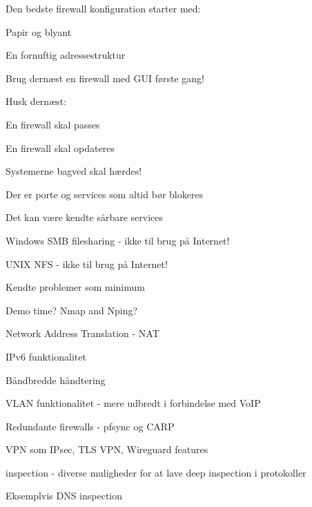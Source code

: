 \documentclass[Screen16to9,17pt]{foils}
\begin{document}
\begin{list1}
\item Den bedste firewall konfiguration starter med:
\begin{list2}
\item Papir og blyant
\item En fornuftig adressestruktur
\end{list2}
\item Brug dernæst en firewall med GUI første gang!
\item Husk dernæst:
\begin{list2}
\item En firewall skal passes
\item En firewall skal opdateres
\item Systemerne bagved skal hærdes!
\end{list2}
\end{list1}





\begin{list1}
\item Der er porte og services som altid bør blokeres
\item Det kan være kendte sårbare services
\begin{list2}
\item Windows SMB filesharing - ikke til brug på Internet!
\item UNIX NFS - ikke til brug på Internet!
\end{list2}
\item Kendte problemer som minimum
\end{list1}

Demo time? Nmap and Nping?



\begin{list2}
\item Network Address Translation - NAT
\item IPv6 funktionalitet

\item Båndbredde håndtering
\item VLAN funktionalitet - mere udbredt i forbindelse med VoIP
\item Redundante firewalls - pfsync og CARP
\item VPN som IPsec, TLS VPN, Wireguard features
\item inspection - diverse muligheder for at lave deep inspection i protokoller
\item Eksemplvis DNS inspection
\end{list2}
\end{document}
